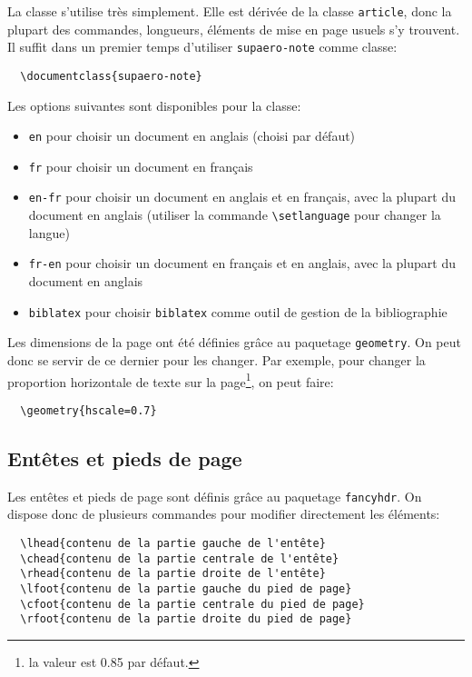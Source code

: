\documentclass[fr,biblatex]{supaero-note}
\begin{document}
La classe s'utilise très simplement. Elle est dérivée de la classe
\texttt{article}, donc la plupart des commandes, longueurs, éléments
de mise en page usuels s'y trouvent. Il suffit dans un premier temps
d'utiliser \texttt{supaero-note} comme classe:

\begin{verbatim}
  \documentclass{supaero-note}
\end{verbatim}

Les options suivantes sont disponibles pour la classe:
\begin{itemize}
\item \verb!en! pour choisir un document en anglais (choisi par
  défaut)
\item \verb!fr! pour choisir un document en français
\item \verb!en-fr! pour choisir un document en anglais et en
  français, avec la plupart du document en anglais (utiliser la
  commande \verb!\setlanguage! pour changer la langue)
\item \verb!fr-en! pour choisir un document en français et en
  anglais, avec la plupart du document en anglais
\item \verb!biblatex! pour choisir \verb!biblatex! comme outil de
  gestion de la bibliographie
\end{itemize}

Les dimensions de la page ont été définies grâce au paquetage
\texttt{geometry}. On peut donc se servir de ce dernier pour les
changer. Par exemple, pour changer la proportion horizontale de texte
sur la page\footnote{la valeur est 0.85 par défaut.}, on peut faire:

\begin{verbatim}
  \geometry{hscale=0.7}
\end{verbatim}

\subsection{Entêtes et pieds de page}
\label{sec:entetes-et-pieds}

Les entêtes et pieds de page sont définis grâce au paquetage
\texttt{fancyhdr}. On dispose donc de plusieurs commandes pour
modifier directement les éléments:

\begin{verbatim}
  \lhead{contenu de la partie gauche de l'entête}
  \chead{contenu de la partie centrale de l'entête}
  \rhead{contenu de la partie droite de l'entête}
  \lfoot{contenu de la partie gauche du pied de page}
  \cfoot{contenu de la partie centrale du pied de page}
  \rfoot{contenu de la partie droite du pied de page}
\end{verbatim}
\end{document}
